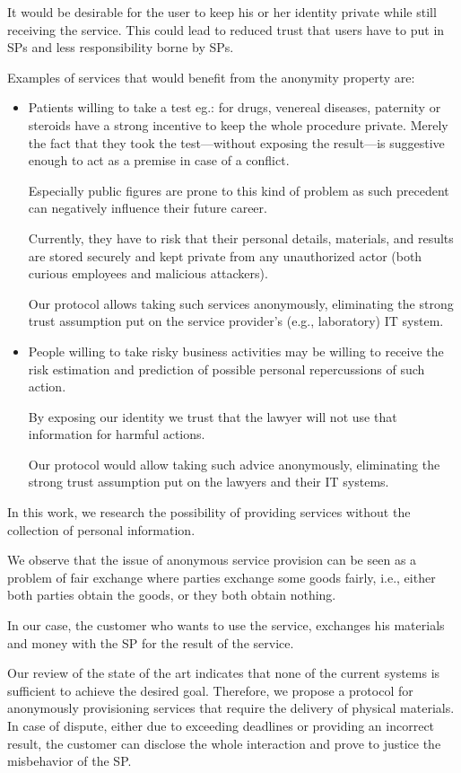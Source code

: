 It would be desirable for the user to keep his or her identity private while still receiving the service. This could lead to reduced trust that users have to put in SPs and less responsibility borne by SPs.

Examples of services that would benefit from the anonymity property are:
\begin{itemize}
    \item Patients willing to take a test eg.: for drugs, venereal diseases, paternity or steroids have a strong incentive to keep the whole procedure private. Merely the fact that they took the test—without exposing the result—is suggestive enough to act as a premise in case of a conflict.

Especially %
public figures are prone to this kind of problem as such precedent can negatively influence their future career.

Currently, they have to risk that their personal details, materials, and results are stored securely and kept private from any unauthorized actor (both curious employees and malicious attackers).

Our protocol allows taking such services anonymously, eliminating the strong trust assumption put on the service provider's (e.g., laboratory) IT system.
\item People willing to take risky business activities may be willing to receive the risk estimation and prediction of possible personal repercussions of such action.

By exposing our identity we trust that the lawyer will not use that information for harmful actions.

Our protocol would allow taking such advice anonymously, eliminating the strong trust assumption put on the lawyers and their IT systems.
\end{itemize}

In this work, we research the possibility of providing services without the collection of personal information.

We observe that the issue of anonymous service provision can be seen as a problem of fair exchange where parties exchange some goods fairly, i.e., either both parties obtain the goods, or they both obtain nothing.

In our case, the customer who wants to use the service, exchanges his materials and money with the SP for the result of the service.

Our review of the state of the art indicates that none of the current systems is sufficient to achieve the desired goal. Therefore, we propose a protocol for anonymously provisioning services that require the delivery of physical materials. In case of dispute, either due to exceeding deadlines or providing an incorrect result, the customer can disclose the whole interaction and prove to justice the misbehavior of the SP.

